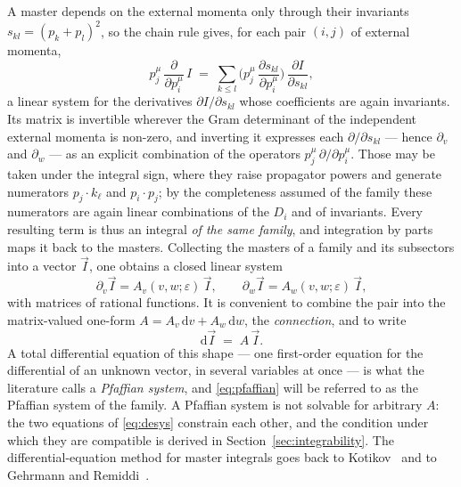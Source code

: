 \documentclass[11pt]{article}
\newcommand{\eps}{\varepsilon}
\newcommand{\dd}{\mathrm{d}}
\begin{document}
A master depends on the external momenta only through their
invariants $s_{kl} = (p_k + p_l)^2$, so the chain rule gives, for
each pair $(i,j)$ of external momenta,
\begin{equation}
  p_j^\mu\,\frac{\partial}{\partial p_i^\mu}\, I
  \;=\; \sum_{k \le l}
  \Big(p_j^\mu\,\frac{\partial s_{kl}}{\partial p_i^\mu}\Big)\,
  \frac{\partial I}{\partial s_{kl}} ,
  \label{eq:chainrule}
\end{equation}
a linear system for the derivatives $\partial I/\partial s_{kl}$
whose coefficients are again invariants.  Its matrix is invertible
wherever the Gram determinant of the independent external momenta is
non-zero, and inverting it expresses each $\partial/\partial s_{kl}$
--- hence $\partial_v$ and $\partial_w$ --- as an explicit
combination of the operators $p_j^\mu\,\partial/\partial p_i^\mu$.
Those may be taken under the integral sign, where they raise
propagator powers and generate numerators $p_j\!\cdot\! k_\ell$ and
$p_i\!\cdot\! p_j$; by the completeness assumed of the family these
numerators are again linear combinations of the $D_i$ and of
invariants.  Every resulting term is thus an integral \emph{of the
same family}, and integration by parts maps it back to the masters.
Collecting
the masters of a family and its subsectors into a vector $\vec I$,
one obtains a closed linear system
\begin{equation}
  \partial_v \vec I = A_v(v,w;\eps)\,\vec I,
  \qquad
  \partial_w \vec I = A_w(v,w;\eps)\,\vec I,
  \label{eq:desys}
\end{equation}
with matrices of rational functions.  It is convenient to combine the
pair into the matrix-valued one-form $A = A_v\,\dd v + A_w\,\dd w$,
the \emph{connection}, and to write
\begin{equation}
  \dd \vec I \;=\; A\,\vec I .
  \label{eq:pfaffian}
\end{equation}
A total differential equation of this shape --- one first-order
equation for the differential of an unknown vector, in several
variables at once --- is what the literature calls a \emph{Pfaffian
system}, and \eqref{eq:pfaffian} will be referred to as the Pfaffian
system of the family.  A Pfaffian system is not solvable for arbitrary
$A$: the two equations of \eqref{eq:desys} constrain each other, and
the condition under which they are compatible is derived in
Section~\ref{sec:integrability}.  The differential-equation method for
master integrals goes back to Kotikov~\cite{kotikov} and to Gehrmann
and Remiddi~\cite{gr}.
\end{document}
